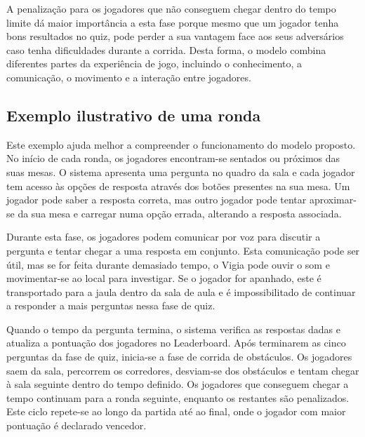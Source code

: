 A penalização para os jogadores que não conseguem chegar dentro do tempo limite dá maior importância a esta fase porque mesmo que um jogador tenha bons resultados no quiz, pode perder a sua vantagem face aos seus adversários caso tenha dificuldades durante a corrida. Desta forma, o modelo combina diferentes partes da experiência de jogo, incluindo o conhecimento, a comunicação, o movimento e a interação entre jogadores.


\subsection{Exemplo ilustrativo de uma ronda}
\label{subsec:exemploRonda}

Este exemplo ajuda melhor a compreender o funcionamento do modelo proposto. No início de cada ronda, os jogadores encontram-se sentados ou próximos das suas mesas. O sistema apresenta uma pergunta no quadro da sala e cada jogador tem acesso às opções de resposta através dos botões presentes na sua mesa. Um jogador pode saber a resposta correta, mas outro jogador pode tentar aproximar-se da sua mesa e carregar numa opção errada, alterando a resposta associada.

Durante esta fase, os jogadores podem comunicar por voz para discutir a pergunta e tentar chegar a uma resposta em conjunto. Esta comunicação pode ser útil, mas se for feita durante demasiado tempo, o Vigia pode ouvir o som e movimentar-se ao local para investigar. Se o jogador for apanhado, este é transportado para a jaula dentro da sala de aula e é impossibilitado de continuar a responder a mais perguntas nessa fase de quiz.

Quando o tempo da pergunta termina, o sistema verifica as respostas dadas e atualiza a pontuação dos jogadores no Leaderboard. Após terminarem as cinco perguntas da fase de quiz, inicia-se a fase de corrida de obstáculos. Os jogadores saem da sala, percorrem os corredores, desviam-se dos obstáculos e tentam chegar à sala seguinte dentro do tempo definido. Os jogadores que conseguem chegar a tempo continuam para a ronda seguinte, enquanto os restantes são penalizados. Este ciclo repete-se ao longo da partida até ao final, onde o jogador com maior pontuação é declarado vencedor.
